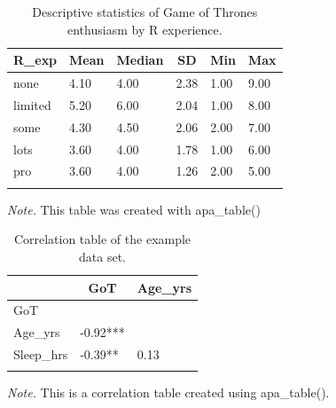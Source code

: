 \documentclass[english,man]{apa6}
\theoremstyle{definition}
\theoremstyle{definition}
\theoremstyle{remark}
\begin{document}
\begin{table}[tbp]
\begin{center}
\begin{threeparttable}
\caption{\label{tab:GoT-by-experience}Descriptive statistics of Game of Thrones enthusiasm by R experience.}
\begin{tabular}{llllll}
\toprule
R\_exp & \multicolumn{1}{c}{Mean} & \multicolumn{1}{c}{Median} & \multicolumn{1}{c}{SD} & \multicolumn{1}{c}{Min} & \multicolumn{1}{c}{Max}\\
\midrule
none & 4.10 & 4.00 & 2.38 & 1.00 & 9.00\\
limited & 5.20 & 6.00 & 2.04 & 1.00 & 8.00\\
some & 4.30 & 4.50 & 2.06 & 2.00 & 7.00\\
lots & 3.60 & 4.00 & 1.78 & 1.00 & 6.00\\
pro & 3.60 & 4.00 & 1.26 & 2.00 & 5.00\\
\bottomrule
\addlinespace
\end{tabular}
\begin{tablenotes}[para]
\textit{Note.} This table was created with apa\_table()
\end{tablenotes}
\end{threeparttable}
\end{center}
\end{table}

\begin{table}[tbp]
\begin{center}
\begin{threeparttable}
\caption{\label{tab:apa-corr-table}Correlation table of the example data set.}
\begin{tabular}{lll}
\toprule
 & \multicolumn{1}{c}{GoT} & \multicolumn{1}{c}{Age\_yrs}\\
\midrule
GoT &  & \\
Age\_yrs & -0.92*** & \\
Sleep\_hrs & -0.39** & 0.13\\
\bottomrule
\addlinespace
\end{tabular}
\begin{tablenotes}[para]
\textit{Note.} This is a correlation table created using apa\_table().
\end{tablenotes}
\end{threeparttable}
\end{center}
\end{table}
\end{document}
